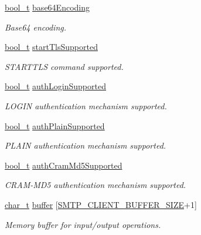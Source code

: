 \begin{DoxyCompactItemize}
\hyperlink{compiler__port_8h_a812d16e5494522586b3784e55d479912}{bool\+\_\+t} \hyperlink{struct__SmtpClientContext_a7805b71cff07e84b4592a21cfc830ac7}{base64\+Encoding}
\begin{DoxyCompactList}\small\item\em Base64 encoding. \end{DoxyCompactList}\item 
\hyperlink{compiler__port_8h_a812d16e5494522586b3784e55d479912}{bool\+\_\+t} \hyperlink{struct__SmtpClientContext_a746552b8071ec5a7b84d00f194c19fb9}{start\+Tls\+Supported}
\begin{DoxyCompactList}\small\item\em S\+T\+A\+R\+T\+T\+LS command supported. \end{DoxyCompactList}\item 
\hyperlink{compiler__port_8h_a812d16e5494522586b3784e55d479912}{bool\+\_\+t} \hyperlink{struct__SmtpClientContext_aee293f97c92ff4d3b13d738ccd54597a}{auth\+Login\+Supported}
\begin{DoxyCompactList}\small\item\em L\+O\+G\+IN authentication mechanism supported. \end{DoxyCompactList}\item 
\hyperlink{compiler__port_8h_a812d16e5494522586b3784e55d479912}{bool\+\_\+t} \hyperlink{struct__SmtpClientContext_aaa2a532277fb8bc8616baf84cd13775b}{auth\+Plain\+Supported}
\begin{DoxyCompactList}\small\item\em P\+L\+A\+IN authentication mechanism supported. \end{DoxyCompactList}\item 
\hyperlink{compiler__port_8h_a812d16e5494522586b3784e55d479912}{bool\+\_\+t} \hyperlink{struct__SmtpClientContext_a266325289e109a6c5e22a69be1441d1e}{auth\+Cram\+Md5\+Supported}
\begin{DoxyCompactList}\small\item\em C\+R\+A\+M-\/\+M\+D5 authentication mechanism supported. \end{DoxyCompactList}\item 
\hyperlink{compiler__port_8h_a40bb5262bf908c328fbcfbe5d29d0201}{char\+\_\+t} \hyperlink{struct__SmtpClientContext_a4b2eee830af1e3129cf7e5b924172895}{buffer} \mbox{[}\hyperlink{smtp__client_8h_a55cbd4c03a87f28df130203250a61810}{S\+M\+T\+P\+\_\+\+C\+L\+I\+E\+N\+T\+\_\+\+B\+U\+F\+F\+E\+R\+\_\+\+S\+I\+ZE}+1\mbox{]}
\begin{DoxyCompactList}\small\item\em Memory buffer for input/output operations. \end{DoxyCompactList}\item 

\end{DoxyCompactItemize}
